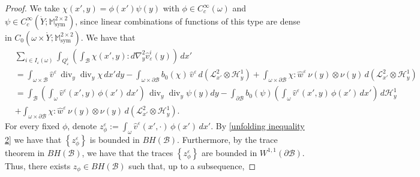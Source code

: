 \documentclass[reqno,10pt]{amsart}
\numberwithin{equation}{section}
\theoremstyle{remark}
\newcommand{\calB}{\mathcal{B}}
\newcommand{\calH}{\mathcal{H}}
\newcommand{\calL}{\mathcal{L}}
\newcommand{\M}{\mathbb{M}}
\DeclareMathOperator{\sym}{sym}
\newcommand{\strong}{\to}
\newcommand{\weakstar}{\xrightharpoonup{*}}
\renewcommand{\div}{\operatorname{div}}
\newcommand{\eps}{\varepsilon}
\newcommand{\D}{\nabla}
\begin{document}
\begin{proof}
We take $\chi(x', y) = \phi(x')\psi(y)$ with $\phi \in C_c^{\infty}(\omega)$ and $\psi \in C_c^{\infty}(\mathring{Y};\M^{2 \times 2}_{\sym})$, since linear combinations of functions of this type are dense in $C_0(\omega \times \mathring{Y};\M^{2 \times 2}_{\sym})$.
We have that
\begin{align*} 
	& \sum_{i \in I_\eps(\omega)} \int_{Q_\eps^i} \left( \int_{\calB} \chi(x', y) : d{\D}^2_{y}\hat{v}_\eps^i(y) \right) \,dx'\\
	& = \int_{\omega \times \calB} \hat{v}^\eps\,\div_{y}\div_{y}\chi \,dx' dy - \int_{\omega \times \partial\calB} b_0(\chi)\,\hat{v}^\eps \,d\left(\calL_{x'}^2 \otimes \calH^{1}_{y}\right) + \int_{\omega \times \partial\calB} \chi : \hat{w}^\eps\, \nu(y) \otimes \nu(y) \,d\left(\calL_{x'}^2 \otimes \calH^{1}_{y}\right)\\
	& = \int_{\calB} \left( \int_{\omega} \hat{v}^\eps(x',y)\,\phi(x') \,dx' \right)\,\div_{y}\div_{y}\psi(y) dy - \int_{\partial\calB} b_0(\psi) \left( \int_{\omega} \hat{v}^\eps(x',y)\,\phi(x') \,dx' \right) \,d\calH^{1}_{y} 
	\\& + \int_{\omega \times \partial\calB} \chi : \hat{w}^\eps\, \nu(y) \otimes \nu(y) \,d\left(\calL_{x'}^2 \otimes \calH^{1}_{y}\right).
\end{align*}
For every fixed $\phi$, denote $z^\eps_\phi := \int_{\omega} \hat{v}^\eps(x',\cdot)\,\phi(x') \,dx'$. 
By \eqref{unfolding inequality 2} we have that $\left\{z^\eps_\phi\right\}$ is bounded in $BH(\calB)$. 
Furthermore, by the trace theorem in $BH(\calB)$, 
we have that the traces $\left\{z^\eps_\phi\right\}$ are bounded in $W^{1,1}(\partial\calB)$. 
Thus, there exists $z_\phi \in BH(\calB)$ such that, up to a subsequence,

\end{proof}
\end{document}
